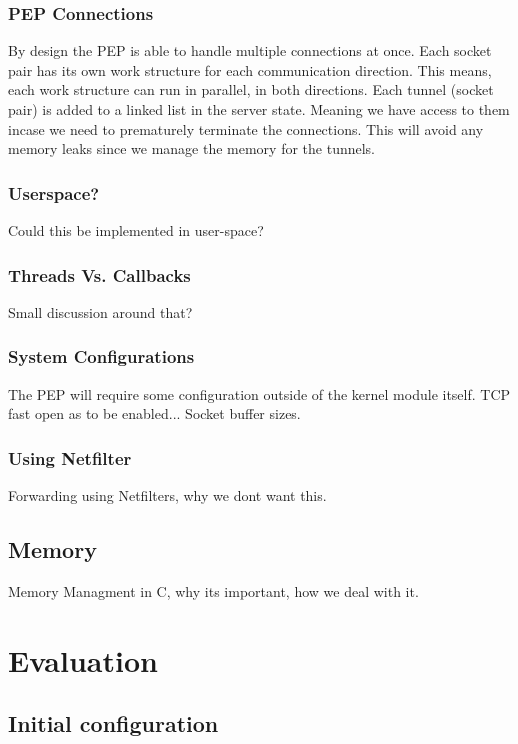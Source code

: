 \documentclass[a4paper,english, 11pt]{report}
\begin{document}
\subsection{PEP Connections}
By design the PEP is able to handle multiple connections at once. Each socket pair has its own work structure for each communication direction. This means, each work structure can run in parallel, in both directions. Each tunnel (socket pair) is added to a linked list in the server state. Meaning we have access to them incase we need to prematurely terminate the connections. This will avoid any memory leaks since we manage the memory for the tunnels.\\

\subsection{Userspace?}
Could this be implemented in user-space?

\subsection{Threads Vs. Callbacks}
Small discussion around that?

\subsection{System Configurations}
The PEP will require some configuration outside of the kernel module itself. TCP fast open as to be enabled... Socket buffer sizes.


\subsection{Using Netfilter}
Forwarding using Netfilters, why we dont want this.


\section{Memory}
Memory Managment in C, why its important, how we deal with it.

\chapter{Evaluation}

\section{Initial configuration}
\end{document}
